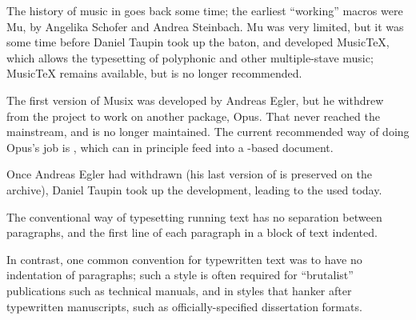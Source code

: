 The history of music in \tex{} goes back some time; the earliest
``working'' macros were Mu\tex{}, by Angelika Schofer and Andrea
Steinbach.  Mu\tex{} was very limited, but it was some time before
Daniel Taupin took up the baton, and developed Music\TeX{}, which
allows the typesetting of polyphonic and other multiple-stave music;
Music\TeX{} remains available, but is no longer recommended.

The first version of Musix\tex{} was developed by Andreas Egler, but
he withdrew from the project to work on another package, Opus\tex{}.
That never reached the mainstream, and is no longer maintained.  The
current recommended way of doing Opus\tex{}'s job is
\href{http://home.gna.org/gregorio/}{}, which can
in principle feed into a \tex{}-based document.

Once Andreas Egler had withdrawn (his last version of
 is preserved on the archive), Daniel Taupin took up
the development, leading to the  used today.
\begin{ctanrefs}
\item[abc2mtex]
\item[lilyglyphs]
\item[M-Tx]
\item[midi2tex]
\item[musictex]
\item[musixtex \nothtml{\rmfamily}(Taupin's version)]
\item[musixtex \nothtml{\rmfamily}(Egler's version)]
\item[musixtex \nothtml{\rmfamily}fonts]
\item[mutex]
\item[pmx]
\end{ctanrefs}


The conventional way of typesetting running text has no separation
between paragraphs, and the first line of each paragraph in a block of
text indented.

In contrast, one common convention for typewritten text was to have no
indentation of paragraphs; such a style is often required for
``brutalist'' publications such as technical manuals, and in styles
that hanker after typewritten manuscripts, such as
officially-specified dissertation formats.

